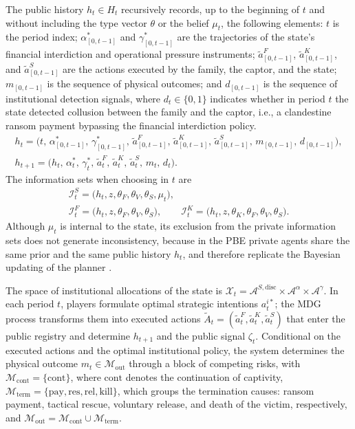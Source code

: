 \documentclass[review,authoryear,12pt]{elsarticle}
\theoremstyle{plain}
\theoremstyle{definition}
\newcommand{\1}{\mathbf{1}}
\begin{document}
The public history $h_t\in H_t$ recursively records, up to the beginning of $t$ and without including the type vector $\theta$ or the belief $\mu_t$, the following elements: $t$ is the period index; $\alpha^\ast_{[0,t-1]}$ and $\gamma^\ast_{[0,t-1]}$ are the trajectories of the state's financial interdiction and operational pressure instruments; $\tilde{a}^F_{[0,t-1]}$, $\tilde{a}^K_{[0,t-1]}$, and $\tilde{a}^S_{[0,t-1]}$ are the actions executed by the family, the captor, and the state; $m_{[0,t-1]}$ is the sequence of physical outcomes; and $d_{[0,t-1]}$ is the sequence of institutional detection signals, where $d_t\in\{0,1\}$ indicates whether in period $t$ the state detected collusion between the family and the captor, i.e., a clandestine ransom payment bypassing the financial interdiction policy.
\begin{gather}
h_t = \bigl(t,\,\alpha^\ast_{[0,t-1]},\,\gamma^\ast_{[0,t-1]},\,\tilde{a}^F_{[0,t-1]},\,\tilde{a}^K_{[0,t-1]},\,\tilde{a}^S_{[0,t-1]},\,m_{[0,t-1]},\,d_{[0,t-1]}\bigr),\label{eq:historia-publica}\\
h_{t+1} = \bigl(h_t,\,\alpha_t^\ast,\,\gamma_t^\ast,\,\tilde{a}_t^F,\,\tilde{a}_t^K,\,\tilde{a}_t^S,\,m_t,\,d_t\bigr).\label{eq:actualizacion-historia}
\end{gather}
The information sets when choosing in $t$ are
\begin{gather*}
\mathcal{I}_t^S=\bigl(h_t,z,\theta_F,\theta_V,\theta_S,\mu_t\bigr),\\
\mathcal{I}_t^F=\bigl(h_t,z,\theta_F,\theta_V,\theta_S\bigr),\qquad
\mathcal{I}_t^K=\bigl(h_t,z,\theta_K,\theta_F,\theta_V,\theta_S\bigr).
\end{gather*}
Although $\mu_t$ is internal to the state, its exclusion from the private information sets does not generate inconsistency, because in the PBE private agents share the same prior and the same public history $h_t$, and therefore replicate the Bayesian updating of the planner \citet{FudenbergTirole1991}.

The space of institutional allocations of the state is $\mathcal{X}_t=\mathcal{A}^{S,\mathrm{disc}}\times\mathcal{A}^{\alpha}\times\mathcal{A}^{\gamma}$. In each period $t$, players formulate optimal strategic intentions $a_t^{i\ast}$; the MDG process transforms them into executed actions $\tilde{A}_t=(\tilde{a}_t^F,\tilde{a}_t^K,\tilde{a}_t^S)$ that enter the public registry and determine $h_{t+1}$ and the public signal $\zeta_t$. Conditional on the executed actions and the optimal institutional policy, the system determines the physical outcome $m_t\in\mathcal{M}_{\mathrm{out}}$ through a block of competing risks, with $\mathcal{M}_{\mathrm{cont}}=\{\mathrm{cont}\}$, where $\mathrm{cont}$ denotes the continuation of captivity, $\mathcal{M}_{\mathrm{term}}=\{\mathrm{pay},\mathrm{res},\mathrm{rel},\mathrm{kill}\}$, which groups the termination causes: ransom payment, tactical rescue, voluntary release, and death of the victim, respectively, and $\mathcal{M}_{\mathrm{out}}=\mathcal{M}_{\mathrm{cont}}\cup\mathcal{M}_{\mathrm{term}}$.
\end{document}
